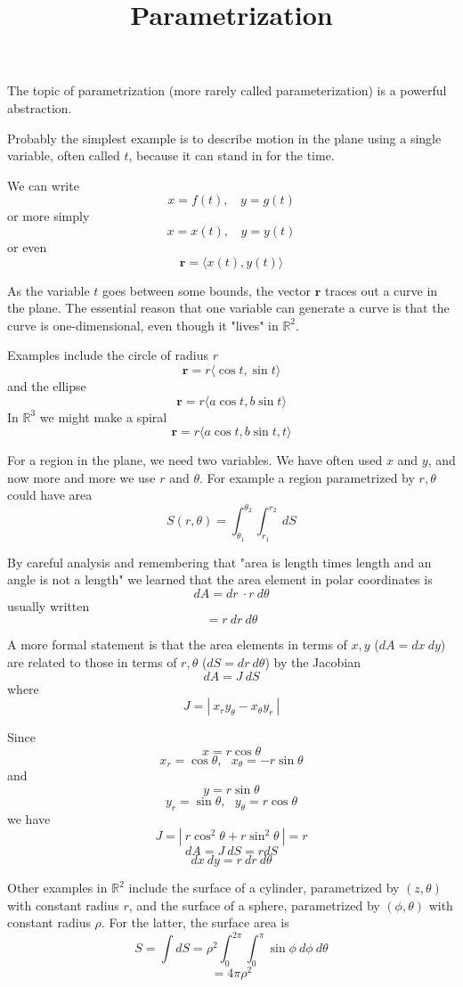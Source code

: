 \documentclass[11pt, oneside]{article}
\title{Parametrization}
\date{}
\begin{document}
\maketitle
\Large
The topic of parametrization (more rarely called parameterization) is a powerful abstraction.

Probably the simplest example is to describe motion in the plane using a single variable, often called $t$, because it can stand in for the time.

We can write
\[ x = f(t), \ \ \ \ y = g(t) \]
or more simply
\[ x = x(t), \ \ \ \ y = y(t) \]
or even
\[ \mathbf{r} = \langle x(t), y(t) \rangle \]

As the variable $t$ goes between some bounds, the vector $\mathbf{r}$ traces out a curve in the plane.  The essential reason that one variable can generate a curve is that the curve is one-dimensional, even though it "lives" in $\mathbb{R}^2$.

Examples include the circle of radius $r$
\[ \mathbf{r} = r \langle \cos t, \sin t \rangle \]
and the ellipse
\[ \mathbf{r} = r \langle a \cos t, b \sin t \rangle \]
In $\mathbb{R}^3$ we might make a spiral
\[ \mathbf{r} = r \langle a \cos t, b \sin t, t\rangle \]

For a region in the plane, we need two variables.  We have often used $x$ and $y$, and now more and more we use $r$ and $\theta$.  For example a region parametrized by $r,\theta$ could have area
\[ S(r, \theta) = \int_{\theta_1}^{\theta_2} \int_{r_1}^{r_2} \ dS  \]

By careful analysis and remembering that "area is length times length and an angle is not a length" we learned that the area element in polar coordinates is
\[ dA = dr \ \cdot r \ d \theta \]
usually written
\[ = r \ dr \ d \theta \]

A more formal statement is that the area elements in terms of $x,y$ ($dA = dx \ dy$) are related to those in terms of $r,\theta$  ($dS = dr \ d \theta$) by the Jacobian
\[ dA = J  \ dS \]
where
\[ J = | \ x_r y_{\theta}  - x_{\theta} y_r \ | \]

Since 
\[ x = r \cos \theta \]
\[ x_r = \cos \theta, \ \ \ x_{\theta} = - r \sin \theta \]
and
\[ y = r \sin \theta \]
\[ y_r = \sin \theta, \ \ \ y_{\theta} = r \cos \theta \]
we have
\[ J = | \ r \cos^2 \theta  + r \sin^2 \theta \ | = r \]
\[ dA = J \ dS = r dS \]
\[ dx \ dy = r \ dr \ d \theta \]

Other examples in $\mathbb{R}^2$ include the surface of a cylinder, parametrized by $(z,\theta)$ with constant radius $r$, and the surface of a sphere, parametrized by $(\phi,\theta)$ with constant radius $\rho$.  For the latter, the surface area is
\[ S = \int dS = \rho^2 \int_0^{2 \pi} \int_0^{\pi} \sin \phi \ d \phi \ d \theta \]
\[ = 4 \pi \rho^2 \]
\end{document}
